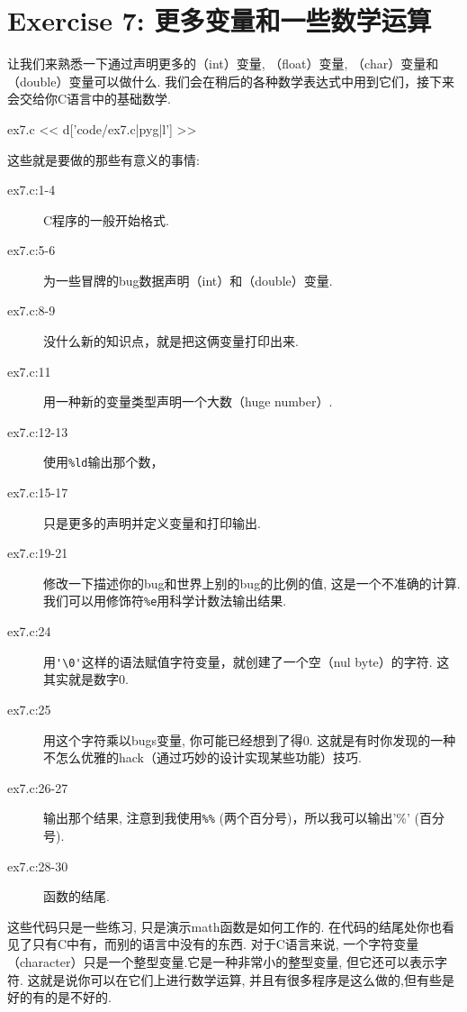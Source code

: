 \chapter{Exercise 7: 更多变量和一些数学运算}

让我们来熟悉一下通过声明更多的（int）变量, （float）变量, （char）变量和（double）变量可以做什么. 我们会在稍后的各种数学表达式中用到它们，接下来会交给你C语言中的基础数学.

\begin{code}{ex7.c}
<< d['code/ex7.c|pyg|l'] >>
\end{code}

这些就是要做的那些有意义的事情:

\begin{description}
\item[ex7.c:1-4] C程序的一般开始格式.
\item[ex7.c:5-6] 为一些冒牌的bug数据声明（int）和（double）变量.
\item[ex7.c:8-9] 没什么新的知识点，就是把这俩变量打印出来.
\item[ex7.c:11] 用一种新的变量类型声明一个大数（huge number）.
\item[ex7.c:12-13] 使用\verb|%ld|输出那个数， %
\item[ex7.c:15-17] 只是更多的声明并定义变量和打印输出.
\item[ex7.c:19-21] 修改一下描述你的bug和世界上别的bug的比例的值, 这是一个不准确的计算.  我们可以用修饰符\verb|%e|用科学计数法输出结果.
\item[ex7.c:24] 用\verb|'\0'|这样的语法赋值字符变量，就创建了一个空（nul byte）的字符.  这其实就是数字0.
\item[ex7.c:25] 用这个字符乘以bugs变量, 你可能已经想到了得0. 这就是有时你发现的一种不怎么优雅的hack（通过巧妙的设计实现某些功能）技巧.
\item[ex7.c:26-27] 输出那个结果, 注意到我使用\verb|%%| (两个百分号)，所以我可以输出'\%' (百分号).
\item[ex7.c:28-30] 函数的结尾.
\end{description}

这些代码只是一些练习, 只是演示math函数是如何工作的.  在代码的结尾处你也看见了只有C中有，而别的语言中没有的东西. 对于C语言来说, 一个字符变量（character）只是一个整型变量.它是一种非常小的整型变量, 但它还可以表示字符. 这就是说你可以在它们上进行数学运算, 并且有很多程序是这么做的,但有些是好的有的是不好的.

